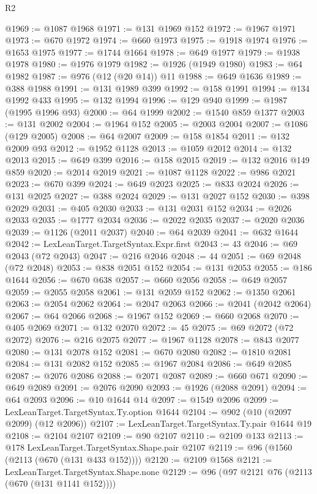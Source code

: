 \begin{lexlean}{R2}
\begin{coremodule}
@1969 := @1087 @1968
@1971 := @131 @1969 @152
@1972 := @1967 @1971
@1973 := @670 @1972
@1974 := @660 @1973
@1975 := @1918 @1974
@1976 := @1653 @1975
@1977 := @1744 @1664
@1978 := @649 @1977
@1979 := @1938 @1978
@1980 := @1976 @1979
@1982 := @1926 (@1949 @1980)
@1983 := @64 @1982
@1987 := @976 (@12 (@20 @14)) @11
@1988 := @649 @1636
@1989 := @388 @1988
@1991 := @131 @1989 @399
@1992 := @158 @1991
@1994 := @134 @1992 @433
@1995 := @132 @1994
@1996 := @129 @940
@1999 := @1987 (@1995 @1996 @93)
@2000 := @64 @1999
@2002 := @1540 @859 @1377
@2003 := @131 @2002
@2004 := @1964 @152
@2005 := @2003 @2004
@2007 := @1086 (@129 @2005)
@2008 := @64 @2007
@2009 := @158 @1854
@2011 := @132 @2009 @93
@2012 := @1952 @1128
@2013 := @1059 @2012
@2014 := @132 @2013
@2015 := @649 @399
@2016 := @158 @2015
@2019 := @132 @2016 @149 @859
@2020 := @2014 @2019
@2021 := @1087 @1128
@2022 := @986 @2021
@2023 := @670 @399
@2024 := @649 @2023
@2025 := @833 @2024
@2026 := @131 @2025
@2027 := @388 @2024
@2029 := @131 @2027 @152
@2030 := @398 @2029
@2031 := @405 @2030
@2033 := @131 @2031 @152
@2034 := @2026 @2033
@2035 := @1777 @2034
@2036 := @2022 @2035
@2037 := @2020 @2036
@2039 := @1126 (@2011 @2037)
@2040 := @64 @2039
@2041 := @632 @1644
@2042 := LexLeanTarget.TargetSyntax.Expr.first
@2043 := 43
@2046 := @69 @2043 (@72 @2043)
@2047 := @216 @2046
@2048 := 44
@2051 := @69 @2048 (@72 @2048)
@2053 := @838 @2051 @152
@2054 := @131 @2053
@2055 := @186 @1644
@2056 := @670 @638
@2057 := @660 @2056
@2058 := @649 @2057
@2059 := @2055 @2058
@2061 := @131 @2059 @152
@2062 := @1350 @2061
@2063 := @2054 @2062
@2064 := @2047 @2063
@2066 := @2041 (@2042 @2064)
@2067 := @64 @2066
@2068 := @1967 @152
@2069 := @660 @2068
@2070 := @405 @2069
@2071 := @132 @2070
@2072 := 45
@2075 := @69 @2072 (@72 @2072)
@2076 := @216 @2075
@2077 := @1967 @1128
@2078 := @843 @2077
@2080 := @131 @2078 @152
@2081 := @670 @2080
@2082 := @1810 @2081
@2084 := @131 @2082 @152
@2085 := @1967 @2084
@2086 := @649 @2085
@2087 := @2076 @2086
@2088 := @2071 @2087
@2089 := @660 @671
@2090 := @649 @2089
@2091 := @2076 @2090
@2093 := @1926 (@2088 @2091)
@2094 := @64 @2093
@2096 := @10 @1644 @14
@2097 := @1549 @2096
@2099 := LexLeanTarget.TargetSyntax.Ty.option @1644
@2104 := @902 (@10 (@2097 @2099) (@12 @2096))
@2107 := LexLeanTarget.TargetSyntax.Ty.pair @1644 @19
@2108 := @2104 @2107
@2109 := @90 @2107
@2110 := @2109 @133
@2113 := @178 LexLeanTarget.TargetSyntax.Shape.pair @2107
@2119 := @96 (@1560 (@2113 (@670 (@131 @433 @152))))
@2120 := @2109 @1568
@2121 := LexLeanTarget.TargetSyntax.Shape.none
@2129 := @96 (@97 @2121 @76 (@2113 (@670 (@131 @1141 @152))))

\end{coremodule}
\end{lexlean}
